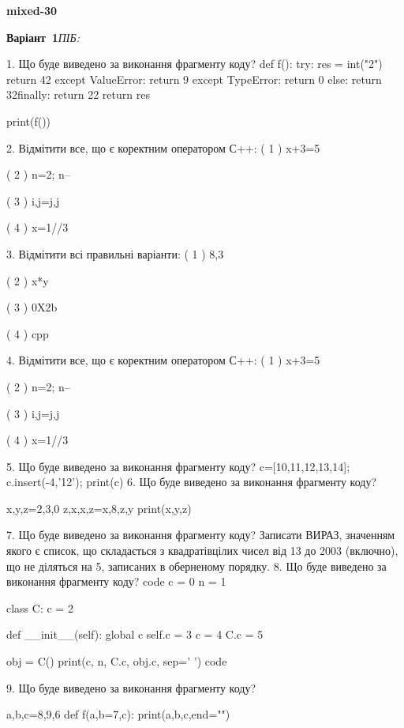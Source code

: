 \documentclass[11pt]{article}
\begin{document}
{\large\textbf{mixed-30}}

\textbf{Варіант \No\,1}\hfill \textit{ПІБ:}\,\underline{\hspace{60mm}}
\vspace{4mm}

1. Що буде виведено за виконання фрагменту коду?
def f():
    try:
        res = int("2")
return 42    except ValueError: return 9
    except TypeError: return 0
else: return 32finally: return 22    return res

print(f())

2. Відмітити все, що є коректним оператором С++:
( 1 ) x+3=5

( 2 ) n=2; n--

( 3 ) i,j=j,j

( 4 ) x=1//3

3. Відмітити всі правильні варіанти:
( 1 ) 8,3

( 2 ) x*y

( 3 ) 0X2b

( 4 ) cpp

4. Відмітити все, що є коректним оператором С++:
( 1 ) x+3=5

( 2 ) n=2; n--

( 3 ) i,j=j,j

( 4 ) x=1//3

5. Що буде виведено за виконання фрагменту коду?
c=[10,11,12,13,14]; c.insert(-4,'12'); print(c)
6. Що буде виведено за виконання фрагменту коду?

x,y,z=2,3,0
z,x,x,z=x,8,z,y
print(x,y,z)

7. Що буде виведено за виконання фрагменту коду?
Записати ВИРАЗ, значенням якого є список, що складається з квадратівцілих чисел від 13 до 2003 (включно), що не діляться на 5, записаних в оберненому порядку.
8. Що буде виведено за виконання фрагменту коду?
code
c = 0
n = 1

class C:
    c = 2
    
    def __init__(self):
global c        self.c = 3
        c = 4
        C.c = 5

obj = C()
print(c, n, C.c, obj.c, sep=' ')
code

9. Що буде виведено за виконання фрагменту коду?

a,b,c=8,9,6
def f(a,b=7,c):
    print(a,b,c,end="")
\end{document}
